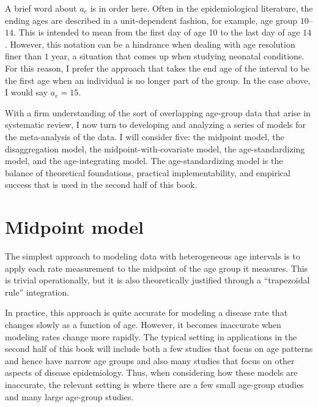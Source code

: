 A brief word about ${a_e}$ is in order here.  Often in the
epidemiological literature, the ending ages are described in a
unit-dependent fashion, for example, age group $10$--$14$.  This is intended
to mean from the first day of age 10 to the last day of age $14$.
However, this notation can be a hindrance when dealing with age
resolution finer than $1$ year, a situation that comes up when studying
neonatal conditions.  For this reason, I prefer the approach that
takes the end age of the interval to be the first age when an
individual is no longer part of the group.  In the case above, I would
say ${a_e} = 15$.


With a firm understanding of the sort of overlapping age-group data
that arise in systematic review, I now turn to developing and
analyzing a series of models for the meta-analysis of the data.
I will consider five: the midpoint model, the disaggregation
model, the midpoint-with-covariate model, the age-standardizing model,
and the age-integrating model.  The age-standardizing model is the
balance of theoretical foundations, practical implementability, and
empirical success that is used in the second half of this
book.

\section{Midpoint model}
\label{theory-age_group_model-mp_model}
The simplest approach to modeling data with heterogeneous age
intervals is to apply each rate measurement to the midpoint of the
age group it measures.  This is trivial operationally, but it is also
theoretically justified through a ``trapezoidal rule'' integration.

In practice, this approach is quite accurate for modeling a
disease rate that changes slowly as a function of age.  However, it
becomes inaccurate when modeling rates change more
rapidly.  The typical setting in applications in the second half of
this book will include both a few studies that focus on age patterns and
hence have narrow age groups and also many studies
that focus on other aspects of disease epidemiology.  Thus, when
considering how these models are inaccurate, the relevant setting is where
there are a few small age-group studies and many large age-group
studies.

